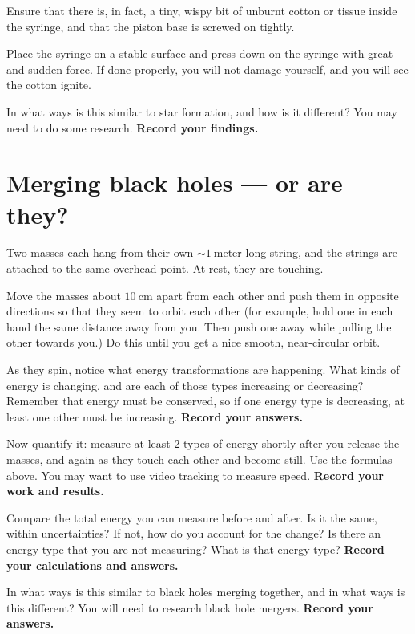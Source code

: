 \begin{steps}
	\item Ensure that there is, in fact, a tiny, wispy bit of unburnt cotton or tissue inside the syringe, and that the piston base is screwed on tightly.
	
	\item Place the syringe on a stable surface and press down on the syringe with great and sudden force. If done properly, you will not damage yourself, and you will see the cotton ignite.

	\item In what ways is this similar to star formation, and how is it different? You may need to do some research. \textbf{Record your findings.}
\end{steps}

\section{Merging black holes --- or are they?}

Two masses each hang from their own $\sim 1\:$meter long string, and the strings are attached to the same overhead point. At rest, they are touching.

\begin{steps}
	\item Move the masses about $10\:$cm apart from each other and push them in opposite directions so that they seem to orbit each other (for example, hold one in each hand the same distance away from you. Then push one away while pulling the other towards you.) Do this until you get a nice smooth, near-circular orbit.
	
	\item As they spin, notice what energy transformations are happening. What kinds of energy is changing, and are each of those types increasing or decreasing? Remember that energy must be conserved, so if one energy type is decreasing, at least one other must be increasing. \textbf{Record your answers.}
	
	\item Now quantify it: measure at least 2 types of energy shortly after you release the masses, and again as they touch each other and become still. Use the formulas above. You may want to use video tracking to measure speed. \textbf{Record your work and results.}
	
	\item Compare the total energy you can measure before and after. Is it the same, within uncertainties? If not, how do you account for the change? Is there an energy type that you are not measuring? What is that energy type? \textbf{Record your calculations and answers.}
	
	\item In what ways is this similar to black holes merging together, and in what ways is this different? You will need to research black hole mergers. \textbf{Record your answers.}
\end{steps}

